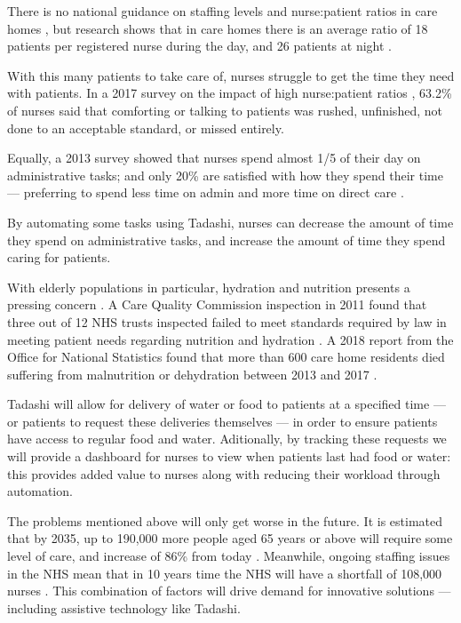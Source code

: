 \documentclass{article}
\begin{document}
There is no national guidance on staffing levels and nurse:patient ratios in care homes \cite{rcnstaffingadvice}, but research shows that in care homes there is an average ratio of 18 patients per registered nurse during the day, and 26 patients at night \cite{rcnstaffingguidance}.

With this many patients to take care of, nurses struggle to get the time they need with patients. In a 2017 survey on the impact of high nurse:patient ratios \cite{unison}, 63.2\% of nurses said that comforting or talking to patients was rushed, unfinished, not done to an acceptable standard, or missed entirely.

Equally, a 2013 survey showed that nurses spend almost 1/5 of their day on administrative tasks; and only 20\% are satisfied with how they spend their time --- preferring to spend less time on admin and more time on direct care \cite{rcnpol}.

By automating some tasks using Tadashi, nurses can decrease the amount of time they spend on administrative tasks, and increase the amount of time they spend caring for patients.

With elderly populations in particular, hydration and nutrition presents a pressing concern \cite{hydrate}. A Care Quality Commission inspection in 2011 found that three out of 12 NHS trusts inspected failed to meet standards required by law in meeting patient needs regarding nutrition and hydration \cite{cqc}. A 2018 report from the Office for National Statistics found that more than 600 care home residents died suffering from malnutrition or dehydration between 2013 and 2017 \cite{ons}.

Tadashi will allow for delivery of water or food to patients at a specified time --- or patients to request these deliveries themselves --- in order to ensure patients have access to regular food and water. Aditionally, by tracking these requests we will provide a dashboard for nurses to view when patients last had food or water: this provides added value to nurses along with reducing their workload through automation. 

The problems mentioned above will only get worse in the future. It is estimated that by 2035, up to 190,000 more people aged 65 years or above will require some level of care, and increase of 86\% from today \cite{lancet}. Meanwhile, ongoing staffing issues in the NHS mean that in 10 years time the NHS will have a shortfall of 108,000 nurses \cite{nuffield}. This combination of factors will drive demand for innovative solutions --- including assistive technology like Tadashi.
\end{document}
